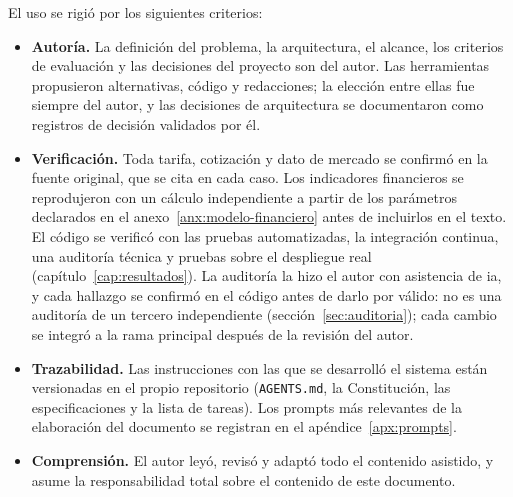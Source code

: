 El uso se rigió por los siguientes criterios:

\begin{itemize}
    \item \textbf{Autoría.} La definición del problema, la arquitectura,
          el alcance, los criterios de evaluación y las decisiones del
          proyecto son del autor. Las herramientas propusieron
          alternativas, código y redacciones; la elección entre ellas fue
          siempre del autor, y las decisiones de arquitectura se
          documentaron como registros de decisión validados por él.
    \item \textbf{Verificación.} Toda tarifa, cotización y dato de
          mercado se confirmó en la fuente original, que se cita en cada
          caso. Los indicadores financieros se reprodujeron con un cálculo
          independiente a partir de los parámetros declarados en el
          anexo~\ref{anx:modelo-financiero} antes de incluirlos en el
          texto. El código se verificó con las pruebas automatizadas, la
          integración continua, una auditoría técnica y pruebas sobre el
          despliegue real (capítulo~\ref{cap:resultados}). La auditoría
          la hizo el autor con asistencia de \gls{ia}, y cada hallazgo
          se confirmó en el código antes de darlo por válido: no es una
          auditoría de un tercero independiente
          (sección~\ref{sec:auditoria}); cada cambio se
          integró a la rama principal después de la revisión del autor.
    \item \textbf{Trazabilidad.} Las instrucciones con las que se
          desarrolló el sistema están versionadas en el propio
          repositorio (\texttt{AGENTS.md}, la Constitución, las
          especificaciones y la lista de tareas). Los prompts más
          relevantes de la elaboración del documento se registran en el
          apéndice~\ref{apx:prompts}.
    \item \textbf{Comprensión.} El autor leyó, revisó y adaptó todo el
          contenido asistido, y asume la responsabilidad total sobre el
          contenido de este documento.
\end{itemize}
